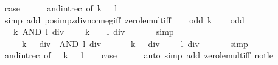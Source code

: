 \begin{isabellebody}
\ {\isacharquery}{\kern0pt}case\isanewline
\ \ \ \ \isamarkupfalse%
\ and{\isacharunderscore}{\kern0pt}int{\isacharunderscore}{\kern0pt}rec\ {\isacharbrackleft}{\kern0pt}of\ {\isacartoucheopen}k\ {\isacharasterisk}{\kern0pt}\ {}{\isacartoucheclose}\ l{\isacharbrackright}{\kern0pt}\isanewline
\ \ \ \ \isamarkupfalse%
\ {\isacharparenleft}{\kern0pt}simp\ add{\isacharcolon}{\kern0pt}\ pos{\isacharunderscore}{\kern0pt}imp{\isacharunderscore}{\kern0pt}zdiv{\isacharunderscore}{\kern0pt}nonneg{\isacharunderscore}{\kern0pt}iff\ zero{\isacharunderscore}{\kern0pt}le{\isacharunderscore}{\kern0pt}mult{\isacharunderscore}{\kern0pt}iff{\isacharparenright}{\kern0pt}\isanewline
{}\isamarkupfalse%
\isanewline
\ \ \isamarkupfalse%
\ {\isacharparenleft}{\kern0pt}odd\ k{\isacharparenright}{\kern0pt}\isanewline
\ \ \isamarkupfalse%
\ odd\ \isamarkupfalse%
\ {\isacartoucheopen}{}\ {\isasymle}\ k\ AND\ l\ div\ {}\ {\isasymlongleftrightarrow}\ {}\ {\isasymle}\ k\ {\isasymor}\ {}\ {\isasymle}\ l\ div\ {}{\isacartoucheclose}\isanewline
\ \ \ \ \isamarkupfalse%
\ simp\isanewline
\ \ \isamarkupfalse%
\ \isamarkupfalse%
\ {\isacartoucheopen}{}\ {\isasymle}\ {\isacharparenleft}{\kern0pt}{}\ {\isacharplus}{\kern0pt}\ k\ {\isacharasterisk}{\kern0pt}\ {}{\isacharparenright}{\kern0pt}\ div\ {}\ AND\ l\ div\ {}\ {\isasymlongleftrightarrow}\ {}\ {\isasymle}\ {\isacharparenleft}{\kern0pt}{}\ {\isacharplus}{\kern0pt}\ k\ {\isacharasterisk}{\kern0pt}\ {}{\isacharparenright}{\kern0pt}\ div\ {}\ {\isasymor}\ {}\ {\isasymle}\ l\ div\ {}{\isacartoucheclose}\isanewline
\ \ \ \ \isamarkupfalse%
\ simp\isanewline
\ \ \isamarkupfalse%
\ and{\isacharunderscore}{\kern0pt}int{\isacharunderscore}{\kern0pt}rec\ {\isacharbrackleft}{\kern0pt}of\ {\isacartoucheopen}{}\ {\isacharplus}{\kern0pt}\ k\ {\isacharasterisk}{\kern0pt}\ {}{\isacartoucheclose}\ l{\isacharbrackright}{\kern0pt}\isanewline
\ \ \isamarkupfalse%
\ {\isacharquery}{\kern0pt}case\isanewline
\ \ \ \ \isamarkupfalse%
\ {\isacharparenleft}{\kern0pt}auto\ simp\ add{\isacharcolon}{\kern0pt}\ zero{\isacharunderscore}{\kern0pt}le{\isacharunderscore}{\kern0pt}mult{\isacharunderscore}{\kern0pt}iff\ not{\isacharunderscore}{\kern0pt}le{\isacharparenright}{\kern0pt}\isanewline

\end{isabellebody}
